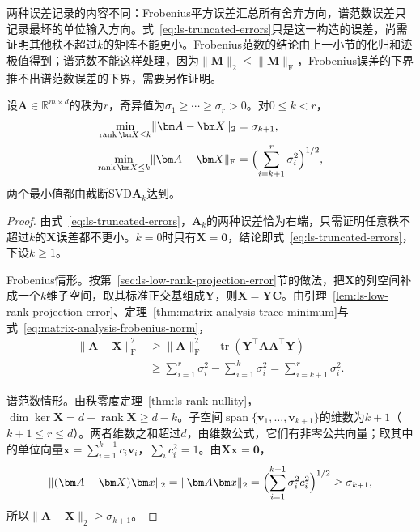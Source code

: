 两种误差记录的内容不同：Frobenius平方误差汇总所有舍弃方向，谱范数误差只记录最坏的单位输入方向。式~\eqref{eq:ls-truncated-errors}只是这一构造的误差，尚需证明其他秩不超过$k$的矩阵不能更小。Frobenius范数的结论由上一小节的化归和迹极值得到；谱范数不能这样处理，因为$\lVert\bm M\rVert_2\leq\lVert\bm M\rVert_{\mathrm F}$，Frobenius误差的下界推不出谱范数误差的下界，需要另作证明。

\begin{theorem}
\label{thm:ls-best-low-rank}
\label{thm:matrix-analysis-best-low-rank}
设$\bm A\in\mathbb R^{m\times d}$的秩为$r$，奇异值为$\sigma_1\geq\cdots\geq\sigma_r>0$。对$0\leq k<r$，
\begin{align}
 \min_{\operatorname{rank}\bm X\leq k}\lVert\bm A-\bm X\rVert_2
 &=\sigma_{k+1},
 \label{eq:matrix-analysis-best-rank-k-spectral}\\
 \min_{\operatorname{rank}\bm X\leq k}\lVert\bm A-\bm X\rVert_{\mathrm F}
 &=\Bigl(\sum_{i=k+1}^r\sigma_i^2\Bigr)^{1/2},
 \label{eq:matrix-analysis-best-rank-k-frobenius}
\end{align}
两个最小值都由截断SVD$\bm A_k$达到。
\end{theorem}
\begin{proof}
由式~\eqref{eq:ls-truncated-errors}，$\bm A_k$的两种误差恰为右端，只需证明任意秩不超过$k$的$\bm X$误差都不更小。$k=0$时只有$\bm X=\bm0$，结论即式~\eqref{eq:ls-truncated-errors}，下设$k\geq1$。

Frobenius情形。按第~\ref{sec:ls-low-rank-projection-error}节的做法，把$\bm X$的列空间补成一个$k$维子空间，取其标准正交基组成$\bm Y$，则$\bm X=\bm Y\bm C$。由引理~\ref{lem:ls-low-rank-projection-error}、定理~\ref{thm:matrix-analysis-trace-minimum}与式~\eqref{eq:matrix-analysis-frobenius-norm}，
\[
 \begin{aligned}
 \lVert\bm A-\bm X\rVert_{\mathrm F}^2
 &\geq\lVert\bm A\rVert_{\mathrm F}^2-\operatorname{tr}(\bm Y^\top\bm A\bm A^\top\bm Y)\\
 &\geq\sum_{i=1}^r\sigma_i^2-\sum_{i=1}^k\sigma_i^2=\sum_{i=k+1}^r\sigma_i^2 .
 \end{aligned}
\]

谱范数情形。由秩零度定理~\ref{thm:ls-rank-nullity}，$\dim\ker\bm X=d-\operatorname{rank}\bm X\geq d-k$。子空间$\operatorname{span}\{\bm v_1,\ldots,\bm v_{k+1}\}$的维数为$k+1$（$k+1\leq r\leq d$）。两者维数之和超过$d$，由维数公式，它们有非零公共向量；取其中的单位向量$\bm x=\sum_{i=1}^{k+1}c_i\bm v_i$，$\sum_ic_i^2=1$。由$\bm X\bm x=\bm0$，
\begin{equation}
 \lVert(\bm A-\bm X)\bm x\rVert_2
 =\lVert\bm A\bm x\rVert_2
 =\Bigl(\sum_{i=1}^{k+1}\sigma_i^2c_i^2\Bigr)^{1/2}
 \geq\sigma_{k+1},
 \label{eq:ls-spectral-lower-bound}
\end{equation}
所以$\lVert\bm A-\bm X\rVert_2\geq\sigma_{k+1}$。
\end{proof}

